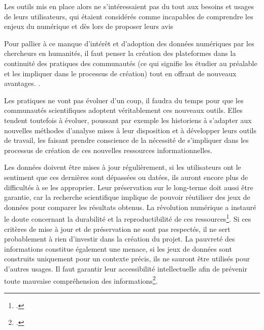 Les outils mis en place alors ne s'intéressaient pas du tout aux besoins et usages de leurs utilisateurs, qui étaient considérés comme incapables de comprendre les enjeux du numérique et dès lors de proposer leurs avis

Pour pallier à ce manque d'intérêt et d'adoption des données numériques par les chercheurs en humanités, il faut penser la création des plateformes dans la continuité des pratiques des communautés (ce qui signifie les étudier au préalable et les impliquer dans le processus de création) tout en offrant de nouveaux avantages. . 

Les pratiques ne vont pas évoluer d'un coup, il faudra du temps pour que les communautés scientifiques adoptent véritablement ces nouveaux outils. Elles tendent toutefois à évoluer, poussant par exemple les historiens à s'adapter aux nouvelles méthodes d'analyse mises à leur disposition et à développer leurs outils de travail, les faisant prendre conscience de la nécessité de s'impliquer dans les processus de création de ces nouvelles ressources informationnelles. 

Les données doivent être mises à jour régulièrement, si les utilisateurs ont le sentiment que ces dernières sont dépassées ou datées, ils auront encore plus de difficultés à se les approprier. Leur préservation sur le long-terme doit aussi être garantie, car la recherche scientifique implique de pouvoir réutiliser des jeux de données pour comparer les résultats obtenus. La révolution numérique a instauré le doute concernant la durabilité et la reproductibilité de ces ressources\footcite{clavert_histoire_2013}. Si ces critères de mise à jour et de préservation ne sont pas respectés, il ne sert probablement à rien d'investir dans la création du projet.  La pauvreté des informations constitue également une menace, si les jeux de données sont construits uniquement pour un contexte précis, ils ne sauront être utilisés pour d'autres usages. Il faut garantir leur accessibilité intellectuelle afin de prévenir toute mauvaise compréhension des informations\footcite[p.67]{clavert_histoire_2013}.

